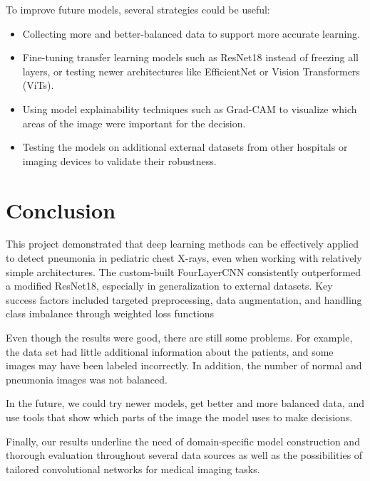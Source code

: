 \documentclass[a4paper,11pt]{article}
\renewcommand{\familydefault}{\sfdefault}
\begin{document}
\vspace{0.2cm}To improve future models, several strategies could be useful:
\begin{itemize}
    \item Collecting more and better-balanced data to support more accurate learning.
    \item Fine-tuning transfer learning models such as ResNet18 instead of freezing all layers, or testing newer architectures like EfficientNet or Vision Transformers (ViTs).
    \item Using model explainability techniques such as Grad-CAM to visualize which areas of the image were important for the decision.
    \item Testing the models on additional external datasets from other hospitals or imaging devices to validate their robustness.
\end{itemize}

\section{Conclusion}
This project demonstrated that deep learning methods can be effectively applied to detect pneumonia in pediatric chest X-rays, even when working with relatively simple architectures. The custom-built FourLayerCNN consistently outperformed a modified ResNet18, especially in generalization to external datasets. Key success factors included targeted preprocessing, data augmentation, and handling class imbalance through weighted loss functions

\vspace{0.2cm}Even though the results were good, there are still some problems. For example, the data set had little additional information about the patients, and some images may have been labeled incorrectly. In addition, the number of normal and pneumonia images was not balanced.

\vspace{0.2cm}In the future, we could try newer models, get better and more balanced data, and use tools that show which parts of the image the model uses to make decisions.

\vspace{0.2cm}Finally, our results underline the need of domain-specific model construction and thorough evaluation throughout several data sources as well as the possibilities of tailored convolutional networks for medical imaging tasks.


\newpage
\printbibliography

\renewcommand{\familydefault}{\sfdefault}  
\thispagestyle{empty}
\listoffigures
\renewcommand{\familydefault}{\sfdefault}  
\thispagestyle{empty}
\listoftables
\renewcommand{\familydefault}{\sfdefault}  
\thispagestyle{empty}
\end{document}
